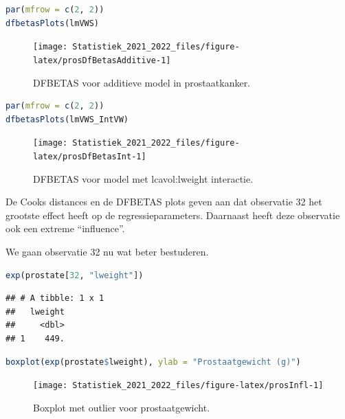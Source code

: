 \documentclass[
  12pt,dutch,coursenotes]{book}
\theoremstyle{definition}
\theoremstyle{definition}
\theoremstyle{definition}
\theoremstyle{definition}
\theoremstyle{remark}
\begin{document}
\begin{lstlisting}[language=R]
par(mfrow = c(2, 2))
dfbetasPlots(lmVWS)
\end{lstlisting}

\begin{figure}

{\centering \texttt{[image: Statistiek\_2021\_2022\_files/figure-latex/prosDfBetasAdditive-1]} 

}

\caption{DFBETAS voor additieve model in prostaatkanker.}\label{fig:prosDfBetasAdditive}
\end{figure}

\begin{lstlisting}[language=R]
par(mfrow = c(2, 2))
dfbetasPlots(lmVWS_IntVW)
\end{lstlisting}

\begin{figure}

{\centering \texttt{[image: Statistiek\_2021\_2022\_files/figure-latex/prosDfBetasInt-1]} 

}

\caption{DFBETAS voor model met lcavol:lweight interactie.}\label{fig:prosDfBetasInt}
\end{figure}

De Cooks distances en de DFBETAS plots geven aan dat observatie 32 het grootste effect heeft op de regressieparameters. Daarnaast heeft deze observatie ook een extreme ``influence''.

We gaan observatie 32 nu wat beter bestuderen.

\begin{lstlisting}[language=R]
exp(prostate[32, "lweight"])
\end{lstlisting}

\begin{lstlisting}
## # A tibble: 1 x 1
##   lweight
##     <dbl>
## 1    449.
\end{lstlisting}

\begin{lstlisting}[language=R]
boxplot(exp(prostate$lweight), ylab = "Prostaatgewicht (g)")
\end{lstlisting}

\begin{figure}

{\centering \texttt{[image: Statistiek\_2021\_2022\_files/figure-latex/prosInfl-1]} 

}

\caption{Boxplot met outlier voor prostaatgewicht.}\label{fig:prosInfl}
\end{figure}
\end{document}
